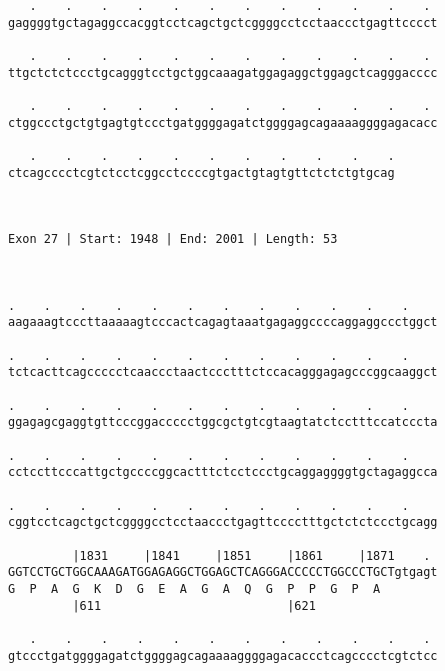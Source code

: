 \documentclass{article}
\begin{document}
\begin{Verbatim}
   .    .    .    .    .    .    .    .    .    .    .    . 
gaggggtgctagaggccacggtcctcagctgctcggggcctcctaaccctgagttcccct
                                                            
   .    .    .    .    .    .    .    .    .    .    .    . 
ttgctctctccctgcagggtcctgctggcaaagatggagaggctggagctcagggacccc
                                                            
   .    .    .    .    .    .    .    .    .    .    .    . 
ctggccctgctgtgagtgtccctgatggggagatctggggagcagaaaaggggagacacc
                                                            
   .    .    .    .    .    .    .    .    .    .    .
ctcagcccctcgtctcctcggcctccccgtgactgtagtgttctctctgtgcag
                                                      
                                                      
 
Exon 27 | Start: 1948 | End: 2001 | Length: 53



.    .    .    .    .    .    .    .    .    .    .    .    
aagaaagtcccttaaaaagtcccactcagagtaaatgagaggccccaggaggccctggct
                                                            
.    .    .    .    .    .    .    .    .    .    .    .    
tctcacttcagccccctcaaccctaactccctttctccacagggagagcccggcaaggct
                                                            
.    .    .    .    .    .    .    .    .    .    .    .    
ggagagcgaggtgttcccggaccccctggcgctgtcgtaagtatctcctttccatcccta
                                                            
.    .    .    .    .    .    .    .    .    .    .    .    
cctccttcccattgctgccccggcactttctcctccctgcaggaggggtgctagaggcca
                                                            
.    .    .    .    .    .    .    .    .    .    .    .    
cggtcctcagctgctcggggcctcctaaccctgagttcccctttgctctctccctgcagg
                                                            
         |1831     |1841     |1851     |1861     |1871    . 
GGTCCTGCTGGCAAAGATGGAGAGGCTGGAGCTCAGGGACCCCCTGGCCCTGCTgtgagt
G  P  A  G  K  D  G  E  A  G  A  Q  G  P  P  G  P  A        
         |611                          |621                 
  
   .    .    .    .    .    .    .    .    .    .    .    . 
gtccctgatggggagatctggggagcagaaaaggggagacaccctcagcccctcgtctcc
                                                            

\end{Verbatim}
\end{document}
